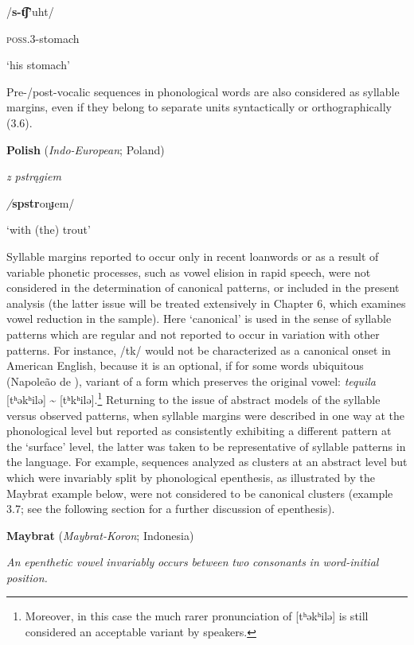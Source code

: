 /\textbf{s-t͡ʃ’}uht/

\textsc{poss.3}{}-stomach

‘his stomach’

\citep[24]{Polian2006}
\z

Pre-/post-vocalic sequences in phonological words are also considered as syllable margins, even if they belong to separate units syntactically or orthographically (3.6).

\ea\label{ex:(3.6)}
   \textbf{Polish} (\textit{Indo-European}; Poland)

\textit{z} \textit{pstrągiem}

\textit{/}\textbf{spstr}oŋɟem/

‘with (the) trout’

\citep[103]{Jassem2003}

\z

  Syllable margins reported to occur only in recent loanwords or as a result of variable phonetic processes, such as vowel elision in rapid speech, were not considered in the determination of canonical patterns, or included in the present analysis (the latter issue will be treated extensively in Chapter 6, which examines vowel reduction in the sample). Here ‘canonical’ is used in the sense of syllable patterns which are regular and not reported to occur in variation with other patterns. For instance, /tk/ would not be characterized as a canonical onset in American English, because it is an optional, if for some words ubiquitous (Napoleão de \citealt{Souza2019}), variant of a form which preserves the original vowel: \textit{tequila} [tʰəkʰilə] {\textasciitilde} [tʰkʰilə].\footnote{ \textrm{Moreover, in this case the much rarer pronunciation of [tʰəkʰilə] is still considered an acceptable variant by speakers.}} Returning to the issue of abstract models of the syllable versus observed patterns, when syllable margins were described in one way at the phonological level but reported as consistently exhibiting a different pattern at the ‘surface’ level, the latter was taken to be representative of syllable patterns in the language. For example, sequences analyzed as clusters at an abstract level but which were invariably split by phonological epenthesis, as illustrated by the Maybrat example below, were not considered to be canonical clusters (example 3.7; see the following section for a further discussion of epenthesis).

\ea\label{ex:(3.7)}
   \textbf{Maybrat} (\textit{Maybrat-Koron}; Indonesia)

\textit{An} \textit{epenthetic} \textit{vowel} \textit{invariably} \textit{occurs} \textit{between} \textit{two} \textit{consonants} \textit{in} \textit{word-initial} \textit{position.}


